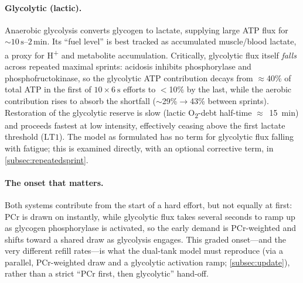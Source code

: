 \documentclass[11pt,a4paper]{article}
\newcommand{\LTone}{\ensuremath{\mathrm{LT1}}}
\begin{document}
\paragraph{Glycolytic (lactic).} Anaerobic glycolysis converts glycogen to lactate, supplying large ATP
flux for ${\sim}10\,\mathrm{s}$--$2\,\mathrm{min}$. Its ``fuel level'' is best tracked as accumulated
muscle/blood lactate, a proxy for H\textsuperscript{+} and metabolite accumulation. Critically, glycolytic
flux itself \emph{falls} across repeated maximal sprints: acidosis inhibits phosphorylase and
phosphofructokinase, so the glycolytic ATP contribution decays from $\approx$40\% of total ATP in the
first of $10\times\SI{6}{\second}$ efforts to $<$10\% by the last,\citep{Gaitanos1993,SciRep2024} while
the aerobic contribution rises to absorb the shortfall ($\sim$29\%$\rightarrow$43\% between
sprints).\citep{Bogdanis1996} Restoration of the glycolytic reserve is slow (lactic O\textsubscript{2}-debt
half-time $\approx$~15~min) and proceeds fastest at low intensity, effectively ceasing above the first
lactate threshold (\LTone). The model as formulated has no term for glycolytic flux falling with fatigue;
this is examined directly, with an optional corrective term, in \cref{subsec:repeatedsprint}.

\paragraph{The onset that matters.} Both systems contribute from the start of a hard effort, but not
equally at first: PCr is drawn on instantly, while glycolytic flux takes several seconds to ramp up as
glycogen phosphorylase is activated,\citep{Parolin1999} so the early demand is PCr-weighted and shifts
toward a shared draw as glycolysis engages.\citep{GonzalezAlonso2000} This graded onset---and the very
different refill rates---is what the dual-tank model must reproduce (via a parallel, PCr-weighted draw and
a glycolytic activation ramp; \cref{subsec:update}), rather than a strict ``PCr first, then glycolytic''
hand-off.
\end{document}
